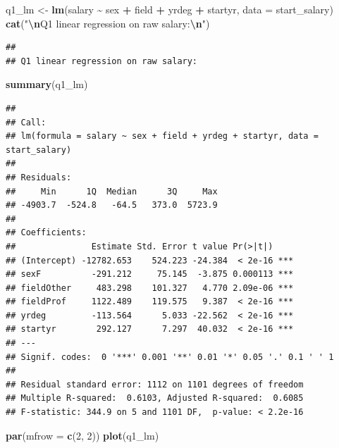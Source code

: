 \documentclass[
]{article}
\newenvironment{Shaded}{\begin{snugshade}}{\end{snugshade}}
\newcommand{\AttributeTok}[1]{\textcolor[rgb]{0.13,0.29,0.53}{#1}}
\newcommand{\DecValTok}[1]{\textcolor[rgb]{0.00,0.00,0.81}{#1}}
\newcommand{\FunctionTok}[1]{\textcolor[rgb]{0.13,0.29,0.53}{\textbf{#1}}}
\newcommand{\NormalTok}[1]{#1}
\newcommand{\OtherTok}[1]{\textcolor[rgb]{0.56,0.35,0.01}{#1}}
\newcommand{\SpecialCharTok}[1]{\textcolor[rgb]{0.81,0.36,0.00}{\textbf{#1}}}
\newcommand{\StringTok}[1]{\textcolor[rgb]{0.31,0.60,0.02}{#1}}
\begin{document}
\begin{Shaded}
\begin{Highlighting}[]
\NormalTok{q1\_lm }\OtherTok{\textless{}{-}} \FunctionTok{lm}\NormalTok{(salary }\SpecialCharTok{\textasciitilde{}}\NormalTok{ sex }\SpecialCharTok{+}\NormalTok{ field }\SpecialCharTok{+}\NormalTok{ yrdeg }\SpecialCharTok{+}\NormalTok{ startyr, }\AttributeTok{data =}\NormalTok{ start\_salary)}
\FunctionTok{cat}\NormalTok{(}\StringTok{"}\SpecialCharTok{\textbackslash{}n}\StringTok{Q1 linear regression on raw salary:}\SpecialCharTok{\textbackslash{}n}\StringTok{"}\NormalTok{)}
\end{Highlighting}
\end{Shaded}

\begin{verbatim}
## 
## Q1 linear regression on raw salary:
\end{verbatim}

\begin{Shaded}
\begin{Highlighting}[]
\FunctionTok{summary}\NormalTok{(q1\_lm)}
\end{Highlighting}
\end{Shaded}

\begin{verbatim}
## 
## Call:
## lm(formula = salary ~ sex + field + yrdeg + startyr, data = start_salary)
## 
## Residuals:
##     Min      1Q  Median      3Q     Max 
## -4903.7  -524.8   -64.5   373.0  5723.9 
## 
## Coefficients:
##               Estimate Std. Error t value Pr(>|t|)    
## (Intercept) -12782.653    524.223 -24.384  < 2e-16 ***
## sexF          -291.212     75.145  -3.875 0.000113 ***
## fieldOther     483.298    101.327   4.770 2.09e-06 ***
## fieldProf     1122.489    119.575   9.387  < 2e-16 ***
## yrdeg         -113.564      5.033 -22.562  < 2e-16 ***
## startyr        292.127      7.297  40.032  < 2e-16 ***
## ---
## Signif. codes:  0 '***' 0.001 '**' 0.01 '*' 0.05 '.' 0.1 ' ' 1
## 
## Residual standard error: 1112 on 1101 degrees of freedom
## Multiple R-squared:  0.6103, Adjusted R-squared:  0.6085 
## F-statistic: 344.9 on 5 and 1101 DF,  p-value: < 2.2e-16
\end{verbatim}

\begin{Shaded}
\begin{Highlighting}[]
\FunctionTok{par}\NormalTok{(}\AttributeTok{mfrow =} \FunctionTok{c}\NormalTok{(}\DecValTok{2}\NormalTok{, }\DecValTok{2}\NormalTok{))}
\FunctionTok{plot}\NormalTok{(q1\_lm)}
\end{Highlighting}
\end{Shaded}
\end{document}
